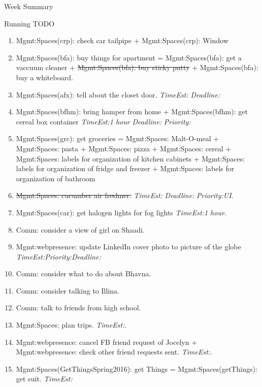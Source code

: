 \documentclass[serif, mathserif, final]{beamer}
\newcommand{\doneTaskNoItem}[1]{\sout{#1}}
\newcommand{\doneTask}[1]{\tiny \item \tiny \sout{#1}}
\newcommand{\te}[1]{\textit{TimeEst:}\textit{#1}}
\newcommand{\dl}[1]{\textit{Deadline:}\textit{#1}}
\newcommand{\pr}[1]{\textit{Priority:}\textit{#1}}
\begin{document}
\begin{frame}
\begin{columns}
\begin{column}{0.5\linewidth}
\begin{block}{Week Summary}
\begin{block}{Running TODO}
\begin{enumerate}
      \item \tiny Mgmt:Spaces(crp): check car tailpipe +
        Mgmt:Spaces(crp): Window 

 
      \item \tiny Mgmt:Spaces(bfa): buy things for apartment =
        Mgmt:Spaces(bfa): get a vaccuum cleaner + \doneTaskNoItem{Mgmt:Spaces(bfa):
          buy sticky putty} + Mgmt:Spaces(bfa): buy a whiteboard. 

      \item \tiny Mgmt:Spaces(afx): tell about the closet door. \te{}
        \dl{}


      \item \tiny Mgmt:Spaces(bfhm): bring hamper from home +
        Mgmt:Spaces(bfhm): get cereal box container \te{1 hour} \dl{}
        \pr{}
      \item \tiny Mgmt:Spaces(grc): get groceries = Mgmt:Spaces:
        Malt-O-meal + Mgmt:Spaces: pasta + Mgmt:Spaces: pizza +
        Mgmt:Spaces: cereal + 
        Mgmt:Spaces: labels for organization of kitchen cabinets +
        Mgmt:Spaces: labels for organization of fridge and freezer +
        Mgmt:Spaces: labels for organization of bathroom
        \doneTask{Mgmt:Spaces: cucumber air freshner.} \te{} \dl{} \pr{UI}.
      

        
      \item \tiny  Mgmt:Spaces(car): get halogen 
        lights for fog lights \te{1 hour}.  
                  
      \item \tiny Comm: consider a view of girl on Shaadi. 

      \item \tiny Mgmt:webpresence: update LinkedIn cover photo to picture
        of the globe \te{}\pr{}\dl{} 

      \item \tiny Comm: consider what to do about Bhavna. 
      \item \tiny Comm: consider talking to Illina. 
      \item \tiny Comm: talk to friends from high school.
      \item \tiny Mgmt:Spaces: plan trips. \te{}. 

      \item \tiny Mgmt:webpresence: cancel FB friend request of
        Jocelyn + Mgmt:webpresence: check other friend requests
        sent. \te{}. 

      \item \tiny Mgmt:Spaces(GetThingsSpring2016): get Things =
        Mgmt:Spaces(getThings): get suit. \te{}
 

\end{enumerate}
\end{block}
\end{block}
\end{column}
\end{columns}
\end{frame}
\end{document}
